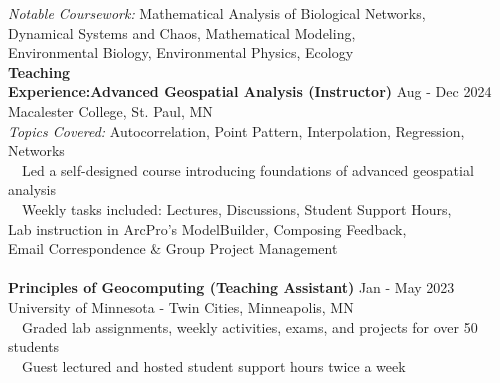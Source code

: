 \documentclass[letterpaper,12pt]{article}
\numberwithin{equation}{section}
\begin{document}
	\hspace*{1.16in} \textit{Notable Coursework:} Mathematical Analysis of Biological Networks, \\
    \hspace*{2.72in} Dynamical Systems and Chaos, Mathematical Modeling,\\ 
    \hspace*{2.72in} Environmental Biology, Environmental Physics, Ecology
\\
 \noindent\textbf{Teaching}\\
 \noindent\textbf{Experience:}\hspace*{.24in}\textbf{Advanced Geospatial Analysis (Instructor)} \hspace*{1.6in} Aug - Dec 2024 \\ \hspace*{1.16in} Macalester College, St. Paul, MN \\ 
 \hspace*{1.16in} \textit{Topics Covered:} Autocorrelation, Point Pattern, Interpolation, Regression, Networks \\
		\hspace*{1.2in} \textbullet ~~Led a self-designed course introducing foundations of advanced geospatial analysis\\
		\hspace*{1.2in} \textbullet ~~Weekly tasks included: Lectures, Discussions, Student Support Hours,\\
		\hspace*{1.6in}Lab instruction in ArcPro's ModelBuilder, Composing Feedback, \\
		\hspace*{1.6in}Email Correspondence \& Group Project Management\\
			\\
 \hspace*{1.16in}\textbf{Principles of Geocomputing (Teaching Assistant)} \hspace*{1.2in} Jan - May 2023 \\ \hspace*{1.16in} University of Minnesota - Twin Cities, Minneapolis, MN \\ 
 \hspace*{1.2in} \textbullet ~~Graded lab assignments, weekly activities, exams, and projects for over 50 students  \\
 \hspace*{1.2in} \textbullet ~~Guest lectured and hosted student support hours twice a week\\
\end{document}
